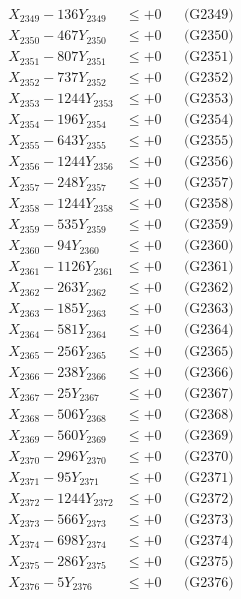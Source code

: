 \documentclass[a4paper,10pt]{article}
\begin{document}
{\begin{align}
X_{2349} - 136Y_{2349} &\leq +0 && \text{(G2349)} \\
X_{2350} - 467Y_{2350} &\leq +0 && \text{(G2350)} \\
\allowbreak
X_{2351} - 807Y_{2351} &\leq +0 && \text{(G2351)} \\
X_{2352} - 737Y_{2352} &\leq +0 && \text{(G2352)} \\
X_{2353} - 1244Y_{2353} &\leq +0 && \text{(G2353)} \\
X_{2354} - 196Y_{2354} &\leq +0 && \text{(G2354)} \\
X_{2355} - 643Y_{2355} &\leq +0 && \text{(G2355)} \\
X_{2356} - 1244Y_{2356} &\leq +0 && \text{(G2356)} \\
X_{2357} - 248Y_{2357} &\leq +0 && \text{(G2357)} \\
X_{2358} - 1244Y_{2358} &\leq +0 && \text{(G2358)} \\
X_{2359} - 535Y_{2359} &\leq +0 && \text{(G2359)} \\
X_{2360} - 94Y_{2360} &\leq +0 && \text{(G2360)} \\
\allowbreak
X_{2361} - 1126Y_{2361} &\leq +0 && \text{(G2361)} \\
X_{2362} - 263Y_{2362} &\leq +0 && \text{(G2362)} \\
X_{2363} - 185Y_{2363} &\leq +0 && \text{(G2363)} \\
X_{2364} - 581Y_{2364} &\leq +0 && \text{(G2364)} \\
X_{2365} - 256Y_{2365} &\leq +0 && \text{(G2365)} \\
X_{2366} - 238Y_{2366} &\leq +0 && \text{(G2366)} \\
X_{2367} - 25Y_{2367} &\leq +0 && \text{(G2367)} \\
X_{2368} - 506Y_{2368} &\leq +0 && \text{(G2368)} \\
X_{2369} - 560Y_{2369} &\leq +0 && \text{(G2369)} \\
X_{2370} - 296Y_{2370} &\leq +0 && \text{(G2370)} \\
\allowbreak
X_{2371} - 95Y_{2371} &\leq +0 && \text{(G2371)} \\
X_{2372} - 1244Y_{2372} &\leq +0 && \text{(G2372)} \\
X_{2373} - 566Y_{2373} &\leq +0 && \text{(G2373)} \\
X_{2374} - 698Y_{2374} &\leq +0 && \text{(G2374)} \\
X_{2375} - 286Y_{2375} &\leq +0 && \text{(G2375)} \\
X_{2376} - 5Y_{2376} &\leq +0 && \text{(G2376)} \\

\end{align}}
\end{document}
